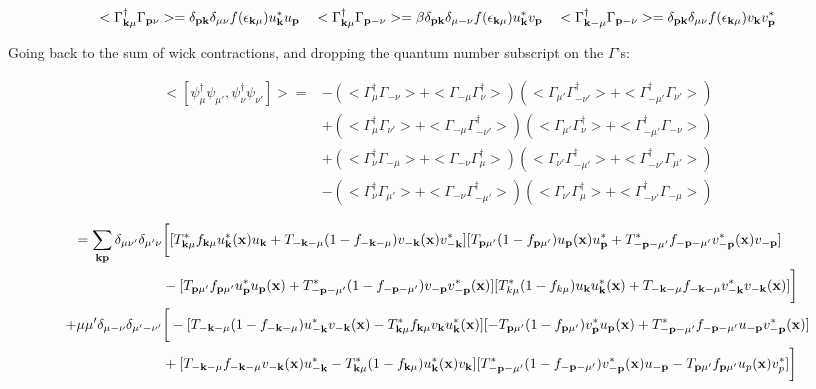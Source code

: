 \documentclass[prb,showpacs,amssymb,amsmath,twocolumn]{revtex4-1}
\begin{document}
\begin{widetext}
\begin{equation*}
<\Gamma^\dagger_{{\bf k}\mu}\Gamma_{{\bf p}\nu}>=\delta_{{\bf p}{\bf k}}\delta_{\mu\nu}f(\epsilon_{{\bf k}\mu})u^*_{\bf k} u_{\bf p} \quad <\Gamma^\dagger_{{\bf k}\mu}\Gamma_{{\bf p}-\nu}>=\beta\delta_{{\bf p}{\bf k}}\delta_{\mu -\nu}f(\epsilon_{{\bf k}\mu})u^*_{\bf k} v_{\bf p} \quad <\Gamma^\dagger_{{\bf k}-\mu}\Gamma_{{\bf p}-\nu}>=\delta_{{\bf p}{\bf k}}\delta_{\mu\nu}f(\epsilon_{{\bf k}\mu})v_{\bf k} v^*_{\bf p}
\end{equation*}

Going back to the sum of wick contractions, and dropping the quantum number subscript on the $\Gamma$'s:

\begin{align*}
<[\psi^\dagger_{\mu} \psi_{\mu'},\psi^\dagger_{\nu} \psi_{\nu'}]>=&-(<\Gamma^\dagger_{\mu}\Gamma_{-\nu}>+<\Gamma_{-\mu}\Gamma^\dagger_{\nu}>)(<\Gamma_{\mu'}\Gamma^\dagger_{-\nu'}>+<\Gamma^\dagger_{-\mu'}\Gamma_{\nu'}>) \\ &+(<\Gamma^\dagger_{\mu}\Gamma_{\nu'}>+<\Gamma_{-\mu}\Gamma^\dagger_{-\nu'}>)(<\Gamma_{\mu'}\Gamma^\dagger_{\nu}>+<\Gamma^\dagger_{-\mu'}\Gamma_{-\nu}>) \\ 
&+(<\Gamma^\dagger_{\nu}\Gamma_{-\mu}>+<\Gamma_{-\nu}\Gamma^\dagger_{\mu}>)(<\Gamma_{\nu'}\Gamma^\dagger_{-\mu'}>+<\Gamma^\dagger_{-\nu'}\Gamma_{\mu'}>) \\
&-(<\Gamma^\dagger_{\nu}\Gamma_{\mu'}>+<\Gamma_{-\nu}\Gamma^\dagger_{-\mu'}>)(<\Gamma_{\nu'}\Gamma^\dagger_{\mu}>+<\Gamma^\dagger_{-\nu'}\Gamma_{-\mu}>)
\end{align*}

\begin{align*}
=\sum\limits_{{\bf k}{\bf p}}\delta_{\mu\nu'}\delta_{\mu'\nu}&\bigg[[T^*_{{\bf k}\mu}f_{{\bf k}\mu}u^*_{\bf k}({\bf x})u_{\bf k}+T_{-{\bf k}-\mu}(1-f_{-{\bf k}-\mu})v_{-{\bf k}}({\bf x})v^*_{-{\bf k}}][T_{{\bf p}\mu'}(1-f_{{\bf p}\mu'})u_{\bf p}({\bf x})u^*_{\bf p}+T^*_{-{\bf p}-\mu'}f_{-{\bf p}-\mu'}v^*_{-{\bf p}}({\bf x})v_{-{\bf p}}] \\ 
&-[T_{{\bf p}\mu'}f_{{\bf p}\mu'}u^*_{\bf p} u_{\bf p}({\bf x})+T^*_{-{\bf p}-\mu'}(1-f_{-{\bf p}-\mu'})v_{-{\bf p}}v^*_{-{\bf p}}({\bf x})] [T^*_{k\mu}(1-f_{k\mu})u_{\bf k} u^*_{\bf k}({\bf x})+T_{-{\bf k}-\mu}f_{-{\bf k}-\mu}v^*_{-{\bf k}}v_{-{\bf k}}({\bf x})]\bigg] 
\\ 
+\mu\mu'\delta_{\mu-\nu}\delta_{\mu'-\nu'}&\bigg[-[T_{-{\bf k}-\mu}(1-f_{-{\bf k}-\mu})u^*_{-{\bf k}}v_{-{\bf k}}({\bf x})-T^*_{{\bf k}\mu}f_{{\bf k}\mu}v_{\bf k} u^*_{\bf k} ({\bf x})][-T_{{\bf p}\mu'}(1-f_{{\bf p}\mu'})v^*_{\bf p} u_{\bf p}({\bf x})+T^*_{-{\bf p}-\mu'}f_{-{\bf p}-\mu'}u_{-{\bf p}}v^*_{-{\bf p}}({\bf x})] \\ 
&+ [T_{-{\bf k}-\mu}f_{-{\bf k}-\mu}v_{-{\bf k}}({\bf x})u^*_{-{\bf k}}-T^*_{{\bf k}\mu}(1-f_{{\bf k}\mu})u^*_{\bf k} ({\bf x})v_{\bf k}][T^*_{-{\bf p}-\mu'}(1-f_{-{\bf p}-\mu'})v^*_{-{\bf p}}({\bf x})u_{-{\bf p}}-T_{{\bf p}\mu'}f_{{\bf p}\mu'}u_p({\bf x})v^*_p]\bigg]
\end{align*}


\end{widetext}
\end{document}
